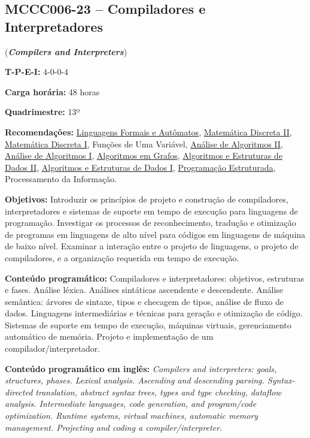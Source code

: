 \documentclass[class=article, crop=false]{standalone}
\begin{document}
\subsection*{MCCC006-23 -- Compiladores e Interpretadores}
\label{disc:compi}

(\textbf{\textit{Compilers and Interpreters}})

\begin{center}
    \begin{minipage}{0.85\textwidth}
        \textbf{T-P-E-I:} 4-0-0-4
        
        \textbf{Carga horária:} 48 horas
        
        \textbf{Quadrimestre:} 13º
        
        \textbf{Recomendações:} 
        \hyperref[disc:lfa]{Linguagens Formais e Autômatos},
        \hyperref[disc:mdII]{Matemática Discreta II},
        \hyperref[disc:mdI]{Matemática Discreta I},
        Funções de Uma Variável,
        \hyperref[disc:aaII]{Análise de Algoritmos II},
        \hyperref[disc:aaI]{Análise de Algoritmos I},
        \hyperref[disc:ag]{Algoritmos em Grafos},
        \hyperref[disc:aedII]{Algoritmos e Estruturas de Dados II},
        \hyperref[disc:aedI]{Algoritmos e Estruturas de Dados I},
        \hyperref[disc:pe]{Programação Estruturada},
        Processamento da Informação.
    \end{minipage}
\end{center}

\textbf{Objetivos:}
Introduzir os princípios de projeto e construção de compiladores, interpretadores e sistemas de suporte
em tempo de execução para linguagens de programação. Investigar os processos de reconhecimento, tradução 
e otimização de programas em linguagens de alto nível para códigos em linguagens de máquina de baixo nível.
Examinar a interação entre o projeto de linguagens, o projeto de compiladores, e a organização requerida em
tempo de execução.

\textbf{Conteúdo programático:}
Compiladores e interpretadores: objetivos, estruturas e fases.
Análise léxica. 
Análises sintáticas ascendente e descendente. 
Análise semântica: árvores de sintaxe, tipos e checagem de tipos, análise de fluxo de dados.
Linguagens intermediárias e técnicas para geração e otimização de código.
Sistemas de suporte em tempo de execução, máquinas virtuais, gerenciamento automático de memória.
Projeto e implementação de um compilador/interpretador.

\textbf{Conteúdo programático em inglês:}
\textit{
Compilers and interpreters: goals, structures, phases.
Lexical analysis.
Ascending and descending parsing.
Syntax-directed translation, abstract syntax trees, types and type checking, dataflow analysis.
Intermediate languages, code generation, and program/code optimization.
Runtime systems, virtual machines, automatic memory management.
Projecting and coding a compiler/interpreter.
}
\end{document}
